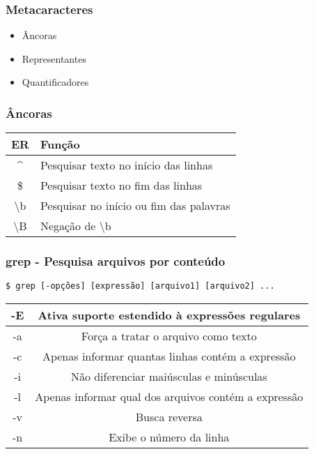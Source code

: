 \documentclass{beamer}
\begin{document}
   \begin{frame}
      \frametitle{Metacaracteres}
      \begin{itemize}
         \item Âncoras
	 \item Representantes
	 \item Quantificadores
      \end{itemize}
   \end{frame}

   \begin{frame}
      \frametitle{Âncoras}
      \begin{table}
         \begin{tabular}{ c | l }
         \textbf{ER} & \textbf{Função}  \\
         \hline 
         \^{} & Pesquisar texto no início das linhas \\
         \hline
         \$ & Pesquisar texto no fim das linhas  \\
         \hline
         \textbackslash b & Pesquisar no início ou fim das palavras  \\
         \hline
         \textbackslash B & Negação de \textbackslash b  \\
         \hline
         \end{tabular}
      \end{table}
   \end{frame}

\begin{frame}[fragile]
   \frametitle{grep - Pesquisa arquivos por conteúdo}
   \begin{verbatim}
$ grep [-opções] [expressão] [arquivo1] [arquivo2] ...
   \end{verbatim}
   \begin{table}
      \begin{tabular}{ c | c }
         \textbf{-E} & \textbf{Ativa suporte estendido à expressões regulares} \\ 
	 \hline
	 -a & Força a tratar o arquivo como texto \\
	 \hline
         -c & Apenas informar quantas linhas contém a expressão \\
         \hline 
         -i & Não diferenciar maiúsculas e minúsculas \\
         \hline
         -l & Apenas informar qual dos arquivos contém a expressão \\
         \hline
         -v & Busca reversa \\
         \hline
         -n & Exibe o número da linha \\
         \hline
      \end{tabular}
   \end{table}
\end{frame}
\end{document}

